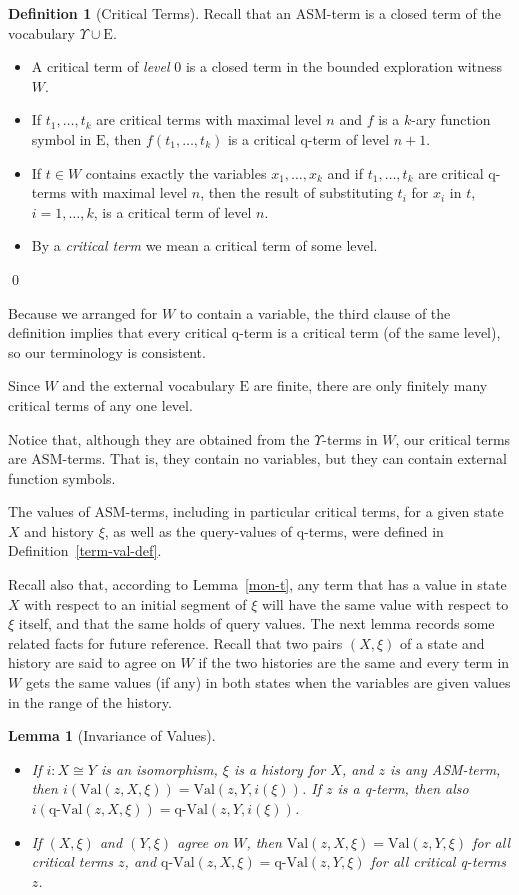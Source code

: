 \documentclass{LMCS}
\newtheorem{la}[thm]{Lemma}
\theoremstyle{definition}
\newtheorem{df}[thm]{Definition}
\newenvironment{ls}{\begin{itemize}}{\end{itemize}}
\newcommand{\E}{\mathrm{E}}
\newcommand{\U}{\Upsilon}
\newcommand{\qval}[3]{\ensuremath{\text{q-Val}(#1,#2,#3)}}
\newcommand{\val}[3]{\ensuremath{\text{Val}(#1,#2,#3)}}
\begin{document}
\begin{df}[Critical Terms] Recall that an ASM-term is a
  closed term of the vocabulary $\U \cup \E$.
  \begin{ls}
    \item A critical  term of \emph{level} 0 is a closed term in the
    bounded exploration witness $W$.
    \item If $t_1,\ldots,t_k$ are critical terms with maximal level
    $n$ and $f$ is a $k$-ary function symbol in $\E$, then
    $f(t_1,\dots,t_k)$ is a critical q-term of level $n+1$.
    \item If $t \in W$ contains exactly the variables $x_1,\ldots,x_k$
    and if $t_1,\ldots,t_k$ are critical q-terms with maximal level $n$,
    then the result of substituting $t_i$ for $x_i$ in $t$, $i =
    1,\ldots,k$, is a critical term of level $n$.
    \item By a \emph{critical  term} we mean a critical  term of some level.
  \end{ls}
\qed\end{df}

Because we arranged for $W$ to contain a variable, the third clause of
the definition implies that every critical q-term is a critical term
(of the same level), so our terminology is consistent.

Since $W$ and the external vocabulary $\E$ are finite, there are
only finitely many critical terms of any one level.

Notice that, although they are obtained from the $\U$-terms
in $W$, our critical terms are ASM-terms.  That is, they
contain no variables, but they can contain external function
symbols.

The values of ASM-terms, including in particular critical terms, for
a given state $X$ and history $\xi$, as well as the query-values of
q-terms, were defined in Definition~\ref{term-val-def}.

Recall also that, according to Lemma~\ref{mon-t}, any term that has
a value in state $X$ with respect to an initial segment of $\xi$
will have the same value with respect to $\xi$ itself, and that the
same holds of query values. The next lemma records some related
facts for future reference. Recall that two pairs $(X,\xi)$ of a
state and history are said to agree on $W$ if the two histories are
the same and every term in $W$ gets the same values (if any) in both
states when the variables are given values in the range of the
history.

\begin{la}[Invariance of Values]  \label{tag-val-invar}
\mbox{}
  \begin{ls}
    \item If $i:X\cong Y$ is an isomorphism, $\xi$ is a history for
    $X$, and $z$ is any ASM-term, then $i(\val zX\xi)=\val zY{i(\xi)}$.
    If $z$ is a q-term, then also $i(\qval zX\xi)=\qval zY{i(\xi)}$.
    \item If $(X,\xi)$ and $(Y,\xi)$ agree on $W$, then $\val
    zX\xi=\val zY\xi$ for all critical terms $z$, and
    $\qval zX\xi=\qval zY\xi$ for all critical q-terms $z$.
  \end{ls}
\end{la}
\end{document}
